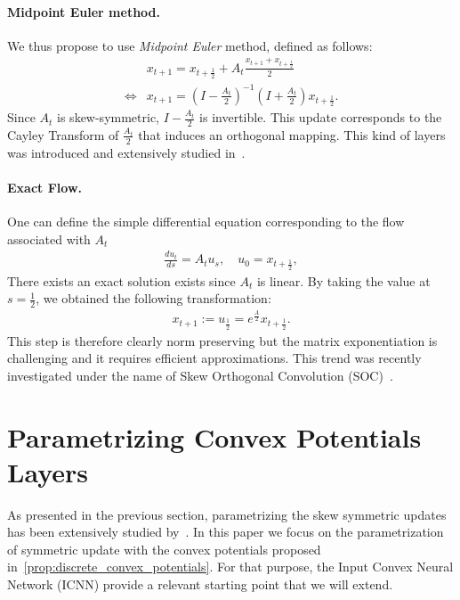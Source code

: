 \paragraph{Midpoint Euler method.}
We thus propose to use \emph{Midpoint Euler} method, defined as follows:
\begin{align*}
&x_{t+1} = x_{t+\frac12} +A_t \frac{x_{t+1}+x_{t+\frac12}}{2}\\
\iff&x_{t+1} = \left(I-\frac{A_t}{2}\right)^{-1}\left(I+\frac{A_t}{2}\right)x_{t+\frac12}.
\end{align*} 
Since $A_t$ is skew-symmetric, $I-\frac{A_t}{2}$ is invertible. This update corresponds to the Cayley Transform of $\frac{A_t}{2}$ that induces an orthogonal mapping. 
This kind of layers was introduced and extensively studied in~\citet{trockman2021orthogonalizing}.  


\paragraph{Exact Flow.} One can define the simple differential equation corresponding to the flow associated with $A_t$  
\begin{align*}
        \frac{du_t}{ds} = A_t u_s,\quad u_0 = x_{t+\frac12},
\end{align*}
There exists an exact solution exists since $A_t$ is linear. By taking the value at $s=\frac12$, we obtained the following transformation:  
 \begin{align*}
x_{t+1} := u_{\frac12}=e^{\frac{A}{2}} x_{t+\frac12}.
\end{align*}
This step is therefore clearly norm preserving but the matrix exponentiation is challenging and it requires efficient approximations. This trend was recently investigated under the name of Skew Orthogonal Convolution (SOC)~\cite{skew2021sahil}.


\section{Parametrizing Convex Potentials Layers}
\label{sec:param}

As presented in the previous section, parametrizing the skew symmetric updates has been extensively studied by~\citet{trockman2021orthogonalizing,skew2021sahil}. In this paper we focus on  the parametrization of symmetric update with the convex potentials proposed in~\ref{prop:discrete_convex_potentials}. For that purpose, the Input Convex Neural Network (ICNN) \citep{amos2017input} provide a relevant starting point that we will extend. 

